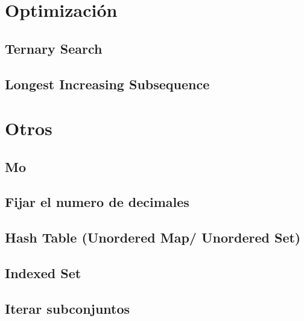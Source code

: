 \documentclass[a4paper,11pt,landscape,twocolumn]{article}
\begin{document}


\section{Optimización}

\subsection{Ternary Search}



\subsection{Longest Increasing Subsequence}



\section{Otros}

\subsection{Mo}



\subsection{Fijar el numero de decimales}



\subsection{Hash Table (Unordered Map/ Unordered Set)}



\subsection{Indexed Set}



\subsection{Iterar subconjuntos}
\end{document}
